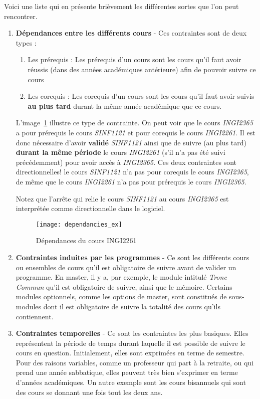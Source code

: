 Voici une liste qui en présente brièvement les différentes sortes que l'on peut rencontrer.
\begin{enumerate}
\item \textbf{Dépendances entre les différents cours} - Ces contraintes  sont de deux types :
	\begin{enumerate}
	\item Les prérequis : Les prérequis d'un cours sont les cours qu'il faut avoir réussis (dans des années académiques antérieure) afin de pouvoir suivre ce cours 
	\item Les corequis : Les corequis d'un cours sont les cours qu'il faut avoir suivis \textbf{au plus tard} durant la même année académique que ce cours.
	\end{enumerate} 

L'image~\ref{fig:cour_dep} illustre ce type de contrainte. On peut voir que le cours \textit{INGI2365} a pour prérequis le cours \textit{SINF1121} et pour corequis le cours \textit{INGI2261}. Il est donc nécessaire d'avoir \textbf{validé} \textit{SINF1121} ainsi que de suivre (au plus tard) \textbf{durant la même période} le cours \textit{INGI2261} (s'il n'a pas été suivi précédemment) pour avoir accès à \textit{INGI2365}. Ces deux contraintes sont directionnelles! le cours \textit{SINF1121} n'a pas pour corequis le cours \textit{INGI2365}, de même que le cours \textit{INGI2261} n'a pas pour prérequis le cours \textit{INGI2365}. 

Notez que l'arrête qui relie le cours \textit{SINF1121} au cours \textit{INGI2365} est interprétée comme directionnelle dans le logiciel. 

\begin{figure}[H]
\centering
\texttt{[image: dependancies\_ex]}
\caption{Dépendances du cours INGI2261}
\label{fig:cour_dep}
\end{figure}

\item \textbf{Contraintes induites par les programmes} - Ce sont les différents cours ou ensembles de cours qu'il est obligatoire de suivre avant de valider un programme. En master, il y a, par exemple, le module intitulé \textit{Tronc Commun} qu'il est obligatoire de suivre, ainsi que le mémoire. Certains modules optionnels, comme les options de master, sont constitués de sous-modules dont il est obligatoire de suivre la totalité des cours qu'ils contiennent. 

\item \textbf{Contraintes temporelles} - Ce sont les contraintes les plus basiques. Elles représentent la période de temps durant laquelle il est possible de suivre le cours en question. Initialement, elles sont exprimées en terme de semestre. Pour des raisons variables, comme un professeur qui part à la retraite, ou qui prend une année sabbatique, elles peuvent très bien s'exprimer en terme d'années académiques. Un autre exemple sont les cours bisannuels qui sont des cours se donnant une fois tout les deux ans. 


\end{enumerate}
